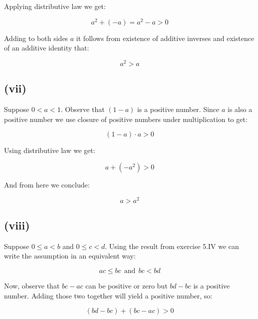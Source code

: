 \documentclass{article}
\begin{document}
Applying distributive law we get:

\begin{equation*}
	a^2 + (-a) = a^{2} - a > 0
\end{equation*}

Adding to both sides \(a\) it follows from existence of additive inverses and existence of an additive identity that:

\begin{equation*}
	a^2 > a
\end{equation*}

\subsection*{(vii)}

Suppose \(0 < a < 1\). Observe that
\((1 - a)\) is a positive number. Since \(a\) is also a positive number we use closure
of positive numbers under multiplication to get:

\begin{equation*}
	(1 -a) \cdot a > 0
\end{equation*}

Using distributive law we get:

\begin{equation*}
	a + (-a^{2}) > 0
\end{equation*}

And from here we conclude:

\begin{equation*}
	a > a^{2}
\end{equation*}

\subsection*{(viii)}

Suppose \(0 \leq a < b\) and \(0 \leq c < d\). Using the result from exercise 5.IV we
can write the assumption in an equivalent way:

\begin{equation*}
	ac \leq bc \ \ \mbox{and} \ \ bc < bd
\end{equation*}

Now, observe that \(bc - ac\) can be positive or zero but \(bd - bc\) is a positive
number. Adding those two together will yield a positive number, so:

\begin{equation*}
	(bd - bc) + (bc - ac) > 0
\end{equation*}
\end{document}
